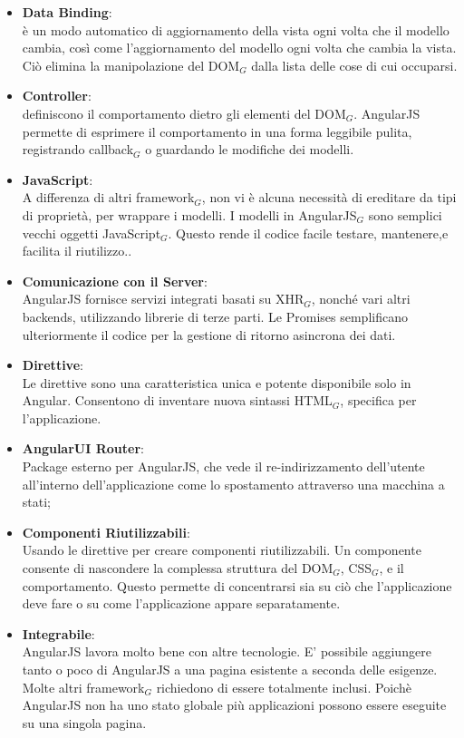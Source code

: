 \begin{itemize}
	\item \textbf{Data Binding}:\\
	è un modo automatico di aggiornamento della vista ogni volta che il modello cambia, così come l'aggiornamento del modello ogni volta che cambia la vista. Ciò  elimina la manipolazione del DOM$_G$ dalla lista delle cose di cui occuparsi.
	\item \textbf{Controller}:\\
	definiscono il comportamento dietro gli elementi del DOM$_G$. AngularJS permette di esprimere il comportamento in una forma leggibile pulita, registrando callback$_G$ o guardando le modifiche dei modelli.
	\item \textbf{JavaScript}:\\
	A differenza di altri framework$_G$, non vi è alcuna necessità di ereditare da tipi di proprietà, per wrappare i modelli. I modelli in AngularJS$_G$ sono semplici vecchi oggetti JavaScript$_G$. Questo rende il codice facile testare, mantenere,e facilita il riutilizzo..
	\item \textbf{ Comunicazione con il Server}:\\
	AngularJS fornisce servizi integrati basati su XHR$_G$, nonché vari altri backends, utilizzando librerie di terze parti. Le Promises semplificano ulteriormente il codice per la gestione di ritorno asincrona dei dati.
	\item \textbf{ Direttive}:\\
	Le direttive sono una caratteristica unica e potente disponibile solo in Angular. Consentono di inventare nuova sintassi HTML$_G$, specifica per l'applicazione.
	\item \textbf{ AngularUI Router}:\\
	Package esterno per AngularJS, che vede il re-indirizzamento dell’utente all’interno dell’applicazione come lo spostamento attraverso una macchina a stati;
	\item \textbf{ Componenti Riutilizzabili}:\\
	Usando le direttive per creare componenti riutilizzabili. Un componente consente di nascondere la complessa struttura del DOM$_G$, CSS$_G$, e il comportamento. Questo permette di concentrarsi sia su ciò che l'applicazione deve fare o su come l'applicazione appare separatamente.
	\item \textbf{ Integrabile}:\\
	AngularJS lavora molto bene con altre tecnologie. E' possibile aggiungere tanto o poco di AngularJS a una pagina esistente a seconda delle esigenze. Molte altri framework$_G$ richiedono di essere totalmente inclusi. Poichè AngularJS non ha uno stato globale più applicazioni possono essere eseguite su una singola pagina.

\end{itemize}
